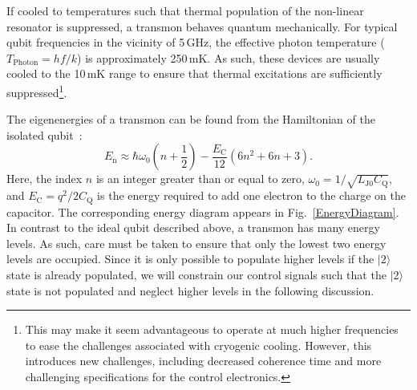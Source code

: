 \documentclass[journal]{IEEEtran}
\newcommand{\CR}[1]{{\color{black}#1}}
\begin{document}
If cooled to temperatures such that thermal population of the non-linear resonator is suppressed, a transmon behaves quantum mechanically. For typical qubit frequencies in the vicinity of 5\,GHz, the effective photon temperature ($T_\text{Photon}=hf/k$) is approximately 250\,mK. As such, these devices are \CR{usually} cooled to the 10\,mK range to ensure that thermal excitations are sufficiently suppressed\footnote{This may make it seem advantageous to operate at much higher frequencies to ease the challenges associated with cryogenic cooling. However, this introduces new challenges, including decreased coherence time and more challenging specifications for the control electronics.}. 

The eigenenergies of a transmon can be found from the Hamiltonian of the isolated qubit~\cite{koch2007charge}:
\begin{equation}
E_\text{n}\approx\hbar\omega_\text{0}\left(n+\frac{1}{2}\right)-\frac{E_\text{C}}{12}\left(6n^2+6n+3\right).\label{En}
\end{equation}
Here, the index $n$ is an integer greater than or equal to zero, $\omega_\text{0}=1/\sqrt{L_\text{J0}C_\text{Q}}$, and $E_\text{C}=q^2/2C_\text{Q}$ is the energy required to add one electron to the charge on the capacitor. %
The corresponding energy diagram appears in Fig.~\ref{EnergyDiagram}.  In contrast to the ideal qubit described above, a transmon has many energy levels. As such, care must be taken to ensure that only the lowest two energy levels are occupied. Since it is only possible to populate higher levels if the $|2\rangle$ state is already populated, we will constrain our control signals such that the $|2\rangle$ state is not populated and neglect higher levels in the following discussion.
\end{document}
